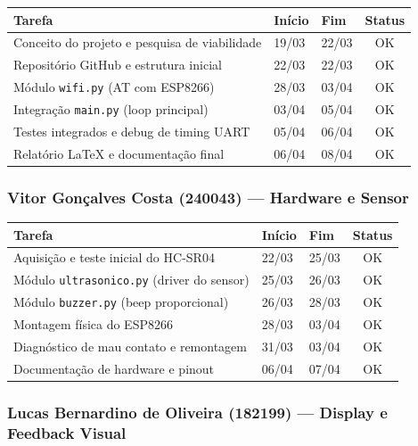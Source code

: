 \documentclass[12pt, a4paper]{article}
\begin{document}
\begin{table}[H]
\centering
\begin{tabular}{lllc}
  \toprule
  \textbf{Tarefa} & \textbf{Início} & \textbf{Fim} & \textbf{Status} \\
  \midrule
  Conceito do projeto e pesquisa de viabilidade & 19/03 & 22/03 & OK \\
  Repositório GitHub e estrutura inicial & 22/03 & 22/03 & OK \\
  Módulo \texttt{wifi.py} (AT com ESP8266) & 28/03 & 03/04 & OK \\
  Integração \texttt{main.py} (loop principal) & 03/04 & 05/04 & OK \\
  Testes integrados e debug de timing UART & 05/04 & 06/04 & OK \\
  Relatório LaTeX e documentação final & 06/04 & 08/04 & OK \\
  \bottomrule
\end{tabular}
\end{table}

\subsubsection*{Vitor Gonçalves Costa (240043) --- Hardware e Sensor}

\begin{table}[H]
\centering
\begin{tabular}{lllc}
  \toprule
  \textbf{Tarefa} & \textbf{Início} & \textbf{Fim} & \textbf{Status} \\
  \midrule
  Aquisição e teste inicial do HC-SR04 & 22/03 & 25/03 & OK \\
  Módulo \texttt{ultrasonico.py} (driver do sensor) & 25/03 & 26/03 & OK \\
  Módulo \texttt{buzzer.py} (beep proporcional) & 26/03 & 28/03 & OK \\
  Montagem física do ESP8266 & 28/03 & 03/04 & OK \\
  Diagnóstico de mau contato e remontagem & 31/03 & 03/04 & OK \\
  Documentação de hardware e pinout & 06/04 & 07/04 & OK \\
  \bottomrule
\end{tabular}
\end{table}

\subsubsection*{Lucas Bernardino de Oliveira (182199) --- Display e Feedback Visual}
\end{document}

